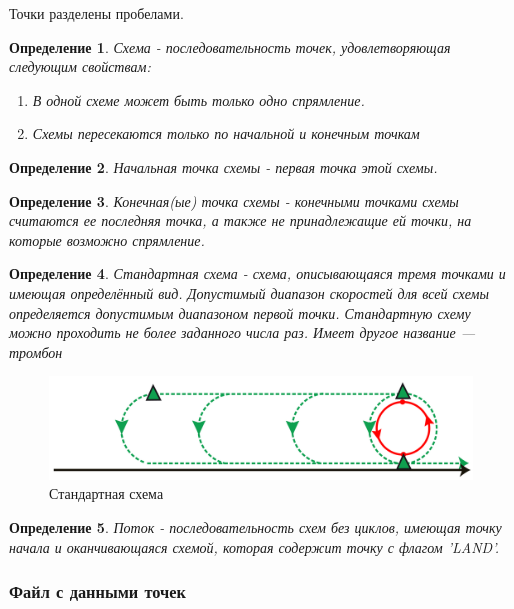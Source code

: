 \documentclass[12pt, a4 paper]{article}
\theoremstyle{plain}
\newtheorem{definition}{Определение}
\begin{document}
Точки разделены пробелами.

\begin{definition}{Схема - последовательность точек, удовлетворяющая следующим свойствам:
\begin{enumerate}
	\item В одной схеме может быть только одно спрямление.
	\item Схемы пересекаются только по начальной и конечным точкам
\end{enumerate}
}
\end{definition}

\begin{definition}{Начальная точка схемы - первая точка  этой схемы.}
\end{definition}

\begin{definition}{Конечная(ые) точка схемы - конечными точками схемы считаются ее последняя точка, а также не принадлежащие ей точки, на которые возможно спрямление.}
\end{definition}

\begin{definition}{Стандартная схема - схема, описывающаяся тремя точками и имеющая определённый вид. Допустимый диапазон скоростей для всей схемы определяется допустимым диапазоном первой точки. Стандартную схему можно проходить не более заданного числа раз. Имеет другое название --- тромбон}
\end{definition}


\begin{figure}[h]
\includegraphics[scale=0.2]{StandardScheme.png}
\caption{Стандартная схема}
\label{fig:StScheme}
\end{figure}


\begin{definition}{Поток - последовательность схем без циклов, имеющая точку начала и оканчивающаяся схемой, которая содержит точку с флагом 'LAND'.}
\end{definition}


\subsubsection{Файл с данными точек}
\end{document}

